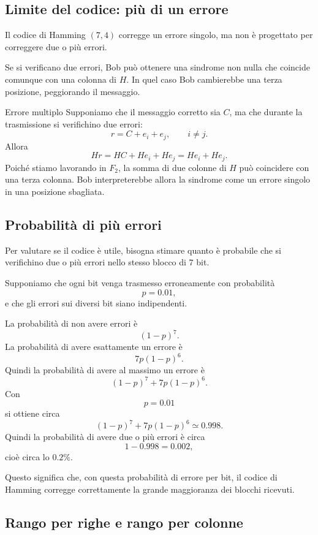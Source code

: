 \documentclass[a4paper]{article}
\begin{document}
\subsection{Limite del codice: più di un errore}

Il codice di Hamming \((7,4)\) corregge un errore singolo, ma non è progettato per correggere due o più errori.

Se si verificano due errori, Bob può ottenere una sindrome non nulla che coincide comunque con una colonna di \(H\). In quel caso Bob cambierebbe una terza posizione, peggiorando il messaggio.

\begin{snippetexample}{Errore multiplo}
    Supponiamo che il messaggio corretto sia \(C\), ma che durante la trasmissione si verifichino due errori:
    \[
        r=C+e_i+e_j,
        \qquad
        i\neq j.
    \]
    Allora
    \[
        Hr
        =
        HC+He_i+He_j
        =
        He_i+He_j.
    \]
    Poiché stiamo lavorando in \(F_2\), la somma di due colonne di \(H\) può coincidere con una terza colonna. Bob interpreterebbe allora la sindrome come un errore singolo in una posizione sbagliata.
\end{snippetexample}

\subsection{Probabilità di più errori}

Per valutare se il codice è utile, bisogna stimare quanto è probabile che si verifichino due o più errori nello stesso blocco di \(7\) bit.

Supponiamo che ogni bit venga trasmesso erroneamente con probabilità
\[
    p=0.01,
\]
e che gli errori sui diversi bit siano indipendenti.

La probabilità di non avere errori è
\[
    (1-p)^7.
\]
La probabilità di avere esattamente un errore è
\[
    7p(1-p)^6.
\]
Quindi la probabilità di avere al massimo un errore è
\[
    (1-p)^7+7p(1-p)^6.
\]
Con
\[
    p=0.01
\]
si ottiene circa
\[
    (1-p)^7+7p(1-p)^6\simeq 0.998.
\]
Quindi la probabilità di avere due o più errori è circa
\[
    1-0.998=0.002,
\]
cioè circa lo \(0.2\%\).

Questo significa che, con questa probabilità di errore per bit, il codice di Hamming corregge correttamente la grande maggioranza dei blocchi ricevuti.

\subsection{Rango per righe e rango per colonne}
\end{document}
